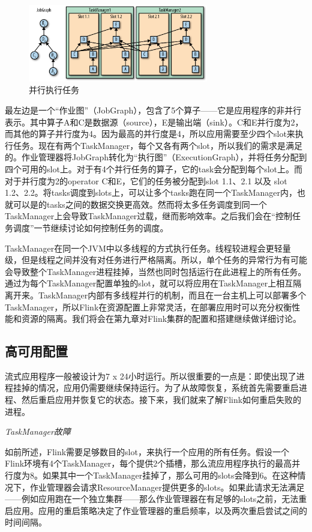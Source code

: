 \documentclass[cn,11pt,chinese]{elegantbook}
\begin{document}
\begin{figure}[htbp]
    \centering
    \includegraphics[width=0.7\textwidth]{images/spaf_0302.png}
    \caption{并行执行任务}
\end{figure}

最左边是一个“作业图”（JobGraph），包含了5个算子——它是应用程序的非并行表示。其中算子A和C是数据源（source），E是输出端（sink）。C和E并行度为2，而其他的算子并行度为4。因为最高的并行度是4，所以应用需要至少四个slot来执行任务。现在有两个TaskManager，每个又各有两个slot，所以我们的需求是满足的。作业管理器将JobGraph转化为“执行图”（ExecutionGraph），并将任务分配到四个可用的slot上。对于有4个并行任务的算子，它的task会分配到每个slot上。而对于并行度为2的operator C和E，它们的任务被分配到slot 1.1、2.1 以及 slot 1.2、2.2。将tasks调度到slots上，可以让多个tasks跑在同一个TaskManager内，也就可以是的tasks之间的数据交换更高效。然而将太多任务调度到同一个TaskManager上会导致TaskManager过载，继而影响效率。之后我们会在“控制任务调度”一节继续讨论如何控制任务的调度。

TaskManager在同一个JVM中以多线程的方式执行任务。线程较进程会更轻量级，但是线程之间并没有对任务进行严格隔离。所以，单个任务的异常行为有可能会导致整个TaskManager进程挂掉，当然也同时包括运行在此进程上的所有任务。通过为每个TaskManager配置单独的slot，就可以将应用在TaskManager上相互隔离开来。TaskManager内部有多线程并行的机制，而且在一台主机上可以部署多个TaskManager，所以Flink在资源配置上非常灵活，在部署应用时可以充分权衡性能和资源的隔离。我们将会在第九章对Flink集群的配置和搭建继续做详细讨论。

\subsection{高可用配置}

流式应用程序一般被设计为7 x 24小时运行。所以很重要的一点是：即使出现了进程挂掉的情况，应用仍需要继续保持运行。为了从故障恢复，系统首先需要重启进程、然后重启应用并恢复它的状态。接下来，我们就来了解Flink如何重启失败的进程。

\textit{TaskManager故障}

如前所述，Flink需要足够数目的slot，来执行一个应用的所有任务。假设一个Flink环境有4个TaskManager，每个提供2个插槽，那么流应用程序执行的最高并行度为8。如果其中一个TaskManager挂掉了，那么可用的slots会降到6。在这种情况下，作业管理器会请求ResourceManager提供更多的slots。如果此请求无法满足——例如应用跑在一个独立集群——那么作业管理器在有足够的slots之前，无法重启应用。应用的重启策略决定了作业管理器的重启频率，以及两次重启尝试之间的时间间隔。
\end{document}
